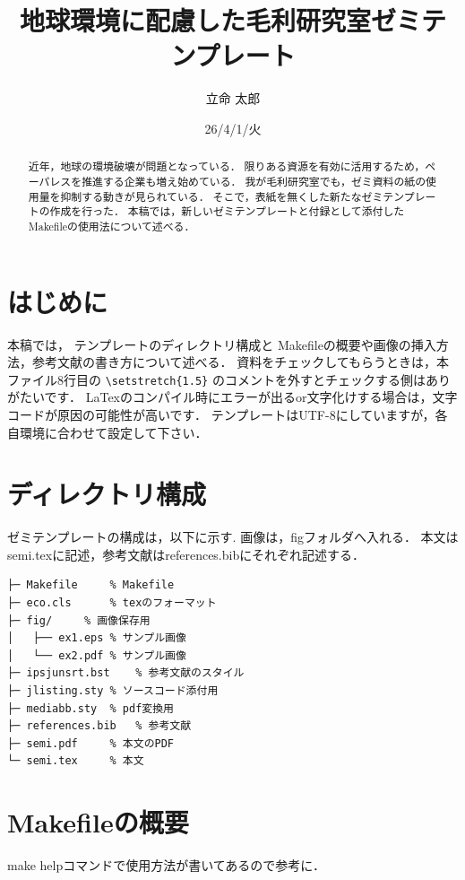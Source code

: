 \documentclass[submit,techreq,noauthor,dvipdfmx]{eco}	%
\begin{document}
\date   {26/4/1/火}				%
\title  {地球環境に配慮した毛利研究室ゼミテンプレート}	%
\author {立命 太郎}				%


\begin{abstract}
近年，地球の環境破壊が問題となっている．
限りある資源を有効に活用するため，ペーパレスを推進する企業も増え始めている．
我が毛利研究室でも，ゼミ資料の紙の使用量を抑制する動きが見られている．
そこで，表紙を無くした新たなゼミテンプレートの作成を行った．
本稿では，新しいゼミテンプレートと付録として添付したMakefileの使用法について述べる．
\end{abstract}
\maketitle

\section{はじめに}
本稿では，
テンプレートのディレクトリ構成と
Makefileの概要や画像の挿入方法，参考文献の書き方について述べる．
資料をチェックしてもらうときは，本ファイル8行目の
\verb|\setstretch{1.5}|
のコメントを外すとチェックする側はありがたいです．
LaTexのコンパイル時にエラーが出るor文字化けする場合は，文字コードが原因の可能性が高いです．
テンプレートはUTF-8にしていますが，各自環境に合わせて設定して下さい．


\section{ディレクトリ構成}
ゼミテンプレートの構成は，以下に示す.
画像は，figフォルダへ入れる．
本文はsemi.texに記述，参考文献はreferences.bibにそれぞれ記述する．

\begin{lstlisting}
├─ Makefile		% Makefile
├─ eco.cls		% texのフォーマット
├─ fig/		% 画像保存用
│   ├── ex1.eps	% サンプル画像
│   └── ex2.pdf	% サンプル画像
├─ ipsjunsrt.bst	% 参考文献のスタイル
├─ jlisting.sty	% ソースコード添付用
├─ mediabb.sty 	% pdf変換用
├─ references.bib	% 参考文献
├─ semi.pdf		% 本文のPDF
└─ semi.tex		% 本文
\end{lstlisting}

\section{Makefileの概要}
make helpコマンドで使用方法が書いてあるので参考に．
\end{document}
